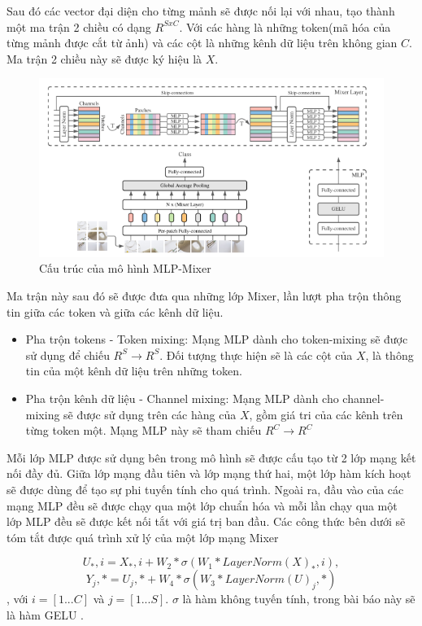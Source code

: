 Sau đó các vector đại diện cho từng mảnh sẽ được nối lại với nhau, tạo thành một ma trận 2 chiều có dạng $R^{SxC}$. Với các hàng là những token(mã hóa của từng mảnh được cắt từ ảnh) và các cột là những kênh dữ liệu trên không gian $C$. Ma trận 2 chiều này sẽ được ký hiệu là $X$.

\begin{figure}[H]
  \centering
  \includegraphics{pics/Chapter3/mixer.png}
  \caption{Cấu trúc của mô hình MLP-Mixer \cite{tolstikhin2021mlpmixer}}
  \label{fig:enter-label}
\end{figure}

Ma trận này sau đó sẽ được đưa qua những lớp Mixer, lần lượt pha trộn thông tin giữa các token và giữa các kênh dữ liệu.
\begin{itemize}
  \item Pha trộn tokens - Token mixing: Mạng MLP dành cho token-mixing sẽ được sử dụng để chiếu $R^{S}\rightarrow R^{S}$. Đối tượng thực hiện sẽ là các cột của $X$, là thông tin của một kênh dữ liệu trên những token.
  \item Pha trộn kênh dữ liệu - Channel mixing: Mạng MLP dành cho channel-mixing sẽ được sử dụng trên các hàng của $X$, gồm giá tri của các kênh trên từng token một. Mạng MLP này sẽ tham chiếu $R^{C}\rightarrow R^{C}$
\end{itemize}

Mỗi lớp MLP được sử dụng bên trong mô hình sẽ được cấu tạo từ 2 lớp mạng kết nối đầy đủ. Giữa lớp mạng đầu tiên và lớp mạng thứ hai, một lớp hàm kích hoạt sẽ được dùng để tạo sự phi tuyến tính cho quá trình. Ngoài ra, đầu vào của các mạng MLP đều sẽ được chạy qua một lớp chuẩn hóa và mỗi lần chạy qua một lớp MLP đều sẽ được kết nối tắt với giá trị ban đầu. Các công thức bên dưới sẽ tóm tắt được quá trình xử lý của một lớp mạng Mixer

\begin{equation}
  U_*,i = X_*,i + W_2*\sigma(W_1*LayerNorm(X)_*,i),
\end{equation}
\begin{equation}
  Y_j,* = U_j,* + W_4*\sigma(W_3*LayerNorm(U)_j,*)
\end{equation},
với $i = [1...C]$ và $j = [1...S]$. $\sigma$ là hàm không tuyến tính, trong bài báo này sẽ là hàm GELU \cite{hendrycks2023gaussian}.

